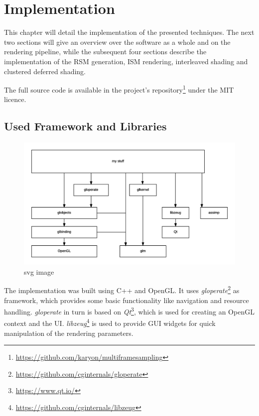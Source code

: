 

\chapter{Implementation}
\label{chap:implementation}

This chapter will detail the implementation of the presented techniques. The next two sections will give an overview over the software as a whole and on the rendering pipeline, while the subsequent four sections describe the implementation of the RSM generation, ISM rendering, interleaved shading and clustered deferred shading.

The full source code is available in the project's repository\footnote{\url{https://github.com/karyon/multiframesampling}} under the MIT licence.


\section{Used Framework and Libraries}

\begin{figure}[htbp]
  \centering
  \includegraphics{graphics/Architecture}
  \caption{svg image}
\end{figure}

The implementation was built using C++ and OpenGL. It uses \textit{gloperate}\footnote{\url{https://github.com/cginternals/gloperate}} as framework, which provides some basic functionality like navigation and resource handling. \textit{gloperate} in turn is based on \textit{Qt}\footnote{\url{https://www.qt.io/}}, which is used for creating an OpenGL context and the UI. \textit{libzeug}\footnote{\url{https://github.com/cginternals/libzeug}} is used to provide GUI widgets for quick manipulation of the rendering parameters.

